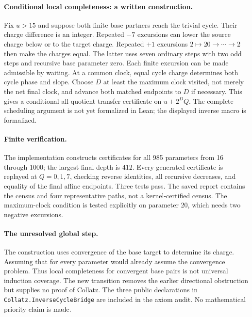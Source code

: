 \documentclass[10pt]{article}
\begin{document}
\paragraph{Conditional local completeness: a written construction.}
Fix $u>15$ and suppose both finite base partners reach the trivial cycle.
Their charge difference is an integer. Repeated $-7$ excursions can lower the
source charge below or to the target charge. Repeated $+1$ excursions
$2\mapsto20\to\cdots\to2$ then make the charges equal.
The latter uses seven ordinary steps with two odd steps and recursive base
parameter zero. Each finite excursion can be made admissible by waiting.
At a common clock, equal cycle charge determines both cycle phase and slope.
Choose $D$ at least the maximum clock visited, not merely the net final clock,
and advance both matched endpoints to $D$ if necessary.
This gives a conditional all-quotient transfer certificate on $u+2^D Q$.
The complete scheduling argument is not yet formalized in Lean; the displayed
inverse macro is formalized.

\paragraph{Finite verification.}
The implementation constructs certificates for all 985 parameters from 16
through 1000; the largest final depth is 412. Every generated certificate is
replayed at $Q=0,1,7$, checking reverse identities, all recursive decreases,
and equality of the final affine endpoints. Three tests pass. The saved report
contains the census and four representative paths, not a kernel-certified census.
The maximum-clock condition is tested explicitly on parameter 20, which needs
two negative excursions.

\paragraph{The unresolved global step.}
The construction uses convergence of the base target to determine its charge.
Assuming that for every parameter would already assume the convergence problem.
Thus local completeness for convergent base pairs is not universal induction
coverage. The new transition removes the earlier directional obstruction but
supplies no proof of Collatz. The three public declarations in
\texttt{Collatz.InverseCycleBridge} are included in the axiom audit.
No mathematical priority claim is made.
\end{document}
